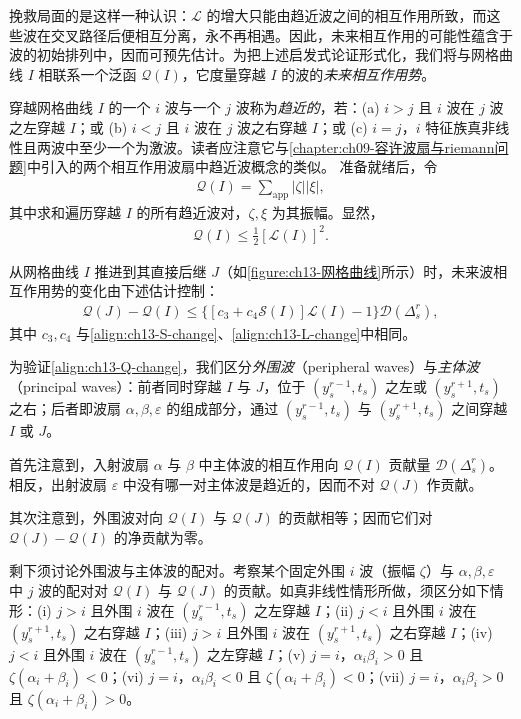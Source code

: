 \documentclass[../../main.tex]{subfiles}
\begin{document}
挽救局面的是这样一种认识：$\mathscr{L}$ 的增大只能由趋近波之间的相互作用所致，而这些波在交叉路径后便相互分离，永不再相遇。因此，未来相互作用的可能性蕴含于波的初始排列中，因而可预先估计。为把上述启发式论证形式化，我们将与网格曲线 $I$ 相联系一个泛函 $\mathscr{Q}(I)$，它度量穿越 $I$ 的波的\emph{未来相互作用势}。

穿越网格曲线 $I$ 的一个 $i$ 波与一个 $j$ 波称为\emph{趋近的}，若：(a) $i>j$ 且 $i$ 波在 $j$ 波之左穿越 $I$；或 (b) $i<j$ 且 $i$ 波在 $j$ 波之右穿越 $I$；或 (c) $i=j$，$i$ 特征族真非线性且两波中至少一个为激波。读者应注意它与\cref{chapter:ch09-容许波扇与riemann问题}中引入的两个相互作用波扇中趋近波概念的类似。
准备就绪后，令
\begin{align}
\mathscr{Q}(I)=\sum_{\mathrm{app}}|\zeta||\xi|,
\label{align:ch13-Q-def}
\end{align}
其中求和遍历穿越 $I$ 的所有趋近波对，$\zeta,\xi$ 为其振幅。显然，
\begin{align}
\mathscr{Q}(I)\leqslant\frac12[\mathscr{L}(I)]^2.
\label{align:ch13-Q-bound}
\end{align}

从网格曲线 $I$ 推进到其直接后继 $J$（如\cref{figure:ch13-网格曲线}所示）时，未来波相互作用势的变化由下述估计控制：
\begin{align}
\mathscr{Q}(J)-\mathscr{Q}(I)\leqslant\big\{[c_3+c_4\mathscr{S}(I)]\mathscr{L}(I)-1\big\}\mathscr{D}(\Delta_s^r),
\label{align:ch13-Q-change}
\end{align}
其中 $c_3,c_4$ 与\eqref{align:ch13-S-change}、\eqref{align:ch13-L-change}中相同。

为验证\eqref{align:ch13-Q-change}，我们区分\emph{外围波}（peripheral waves）与\emph{主体波}（principal waves）：前者同时穿越 $I$ 与 $J$，位于 $(y_s^{r-1},t_s)$ 之左或 $(y_s^{r+1},t_s)$ 之右；后者即波扇 $\alpha,\beta,\varepsilon$ 的组成部分，通过 $(y_s^{r-1},t_s)$ 与 $(y_s^{r+1},t_s)$ 之间穿越 $I$ 或 $J$。

首先注意到，入射波扇 $\alpha$ 与 $\beta$ 中主体波的相互作用向 $\mathscr{Q}(I)$ 贡献量 $\mathscr{D}(\Delta_s^r)$。相反，出射波扇 $\varepsilon$ 中没有哪一对主体波是趋近的，因而不对 $\mathscr{Q}(J)$ 作贡献。

其次注意到，外围波对向 $\mathscr{Q}(I)$ 与 $\mathscr{Q}(J)$ 的贡献相等；因而它们对 $\mathscr{Q}(J)-\mathscr{Q}(I)$ 的净贡献为零。

剩下须讨论外围波与主体波的配对。考察某个固定外围 $i$ 波（振幅 $\zeta$）与 $\alpha,\beta,\varepsilon$ 中 $j$ 波的配对对 $\mathscr{Q}(I)$ 与 $\mathscr{Q}(J)$ 的贡献。如真非线性情形所做，须区分如下情形：(i) $j>i$ 且外围 $i$ 波在 $(y_s^{r-1},t_s)$ 之左穿越 $I$；(ii) $j<i$ 且外围 $i$ 波在 $(y_s^{r+1},t_s)$ 之右穿越 $I$；(iii) $j>i$ 且外围 $i$ 波在 $(y_s^{r+1},t_s)$ 之右穿越 $I$；(iv) $j<i$ 且外围 $i$ 波在 $(y_s^{r-1},t_s)$ 之左穿越 $I$；(v) $j=i$，$\alpha_i\beta_i>0$ 且 $\zeta(\alpha_i+\beta_i)<0$；(vi) $j=i$，$\alpha_i\beta_i<0$ 且 $\zeta(\alpha_i+\beta_i)<0$；(vii) $j=i$，$\alpha_i\beta_i>0$ 且 $\zeta(\alpha_i+\beta_i)>0$。
\end{document}
